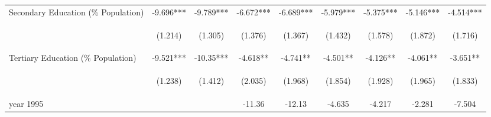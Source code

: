 \begin{landscape}
\begin{table}[htpb!]
\begin{center}
\begin{tabular}{lcccccccc}
Secondary Education (\% Population) &-9.696***&-9.789***&-6.672***&-6.689***&-5.979***&-5.375***&-5.146***&-4.514***\\
&\begin{footnotesize}(1.214)\end{footnotesize}&\begin{footnotesize}(1.305)\end{footnotesize}&\begin{footnotesize}(1.376)\end{footnotesize}&\begin{footnotesize}(1.367)\end{footnotesize}&\begin{footnotesize}(1.432)\end{footnotesize}&\begin{footnotesize}(1.578)\end{footnotesize}&\begin{footnotesize}(1.872)\end{footnotesize}&\begin{footnotesize}(1.716)\end{footnotesize}\\
Tertiary Education (\% Population) &-9.521***&-10.35***&-4.618**&-4.741**&-4.501**&-4.126**&-4.061**&-3.651**\\
&\begin{footnotesize}(1.238)\end{footnotesize}&\begin{footnotesize}(1.412)\end{footnotesize}&\begin{footnotesize}(2.035)\end{footnotesize}&\begin{footnotesize}(1.968)\end{footnotesize}&\begin{footnotesize}(1.854)\end{footnotesize}&\begin{footnotesize}(1.928)\end{footnotesize}&\begin{footnotesize}(1.965)\end{footnotesize}&\begin{footnotesize}(1.833)\end{footnotesize}\\
year 1995&&&-11.36&-12.13&-4.635&-4.217&-2.281&-7.504\\

\end{tabular}
\end{center}
\end{table}
\end{landscape}
